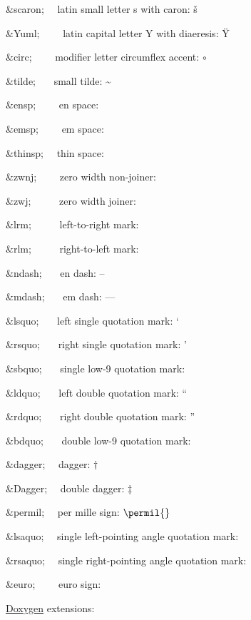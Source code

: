 \begin{DoxyItemize}
\item {\ttfamily \&scaron;}{\ttfamily ~~} latin small letter s with caron\+: \v{s} 
\item {\ttfamily \&Yuml;}{\ttfamily ~~~~} latin capital letter Y with diaeresis\+: \"{Y} 
\item {\ttfamily \&circ;}{\ttfamily ~~~~} modifier letter circumflex accent\+: {$\circ$} 
\item {\ttfamily \&tilde;}{\ttfamily ~~~} small tilde\+: \~{} 
\item {\ttfamily \&ensp;}{\ttfamily ~~~~} en space\+: \enskip{} 
\item {\ttfamily \&emsp;}{\ttfamily ~~~~} em space\+: \quad{} 
\item {\ttfamily \&thinsp;}{\ttfamily ~~} thin space\+: \, 
\item {\ttfamily \&zwnj;}{\ttfamily ~~~~} zero width non-\/joiner\+: {} 
\item {\ttfamily \&zwj;}{\ttfamily ~~~~~} zero width joiner\+:  
\item {\ttfamily \&lrm;}{\ttfamily ~~~~~} left-\/to-\/right mark\+:  
\item {\ttfamily \&rlm;}{\ttfamily ~~~~~} right-\/to-\/left mark\+:  
\item {\ttfamily \&ndash;}{\ttfamily ~~~} en dash\+: -- 
\item {\ttfamily \&mdash;}{\ttfamily ~~~} em dash\+: --- 
\item {\ttfamily \&lsquo;}{\ttfamily ~~~} left single quotation mark\+: ` 
\item {\ttfamily \&rsquo;}{\ttfamily ~~~} right single quotation mark\+: ' 
\item {\ttfamily \&sbquo;}{\ttfamily ~~~} single low-\/9 quotation mark\+: \quotesinglbase{} 
\item {\ttfamily \&ldquo;}{\ttfamily ~~~} left double quotation mark\+: `` 
\item {\ttfamily \&rdquo;}{\ttfamily ~~~} right double quotation mark\+: '' 
\item {\ttfamily \&bdquo;}{\ttfamily ~~~} double low-\/9 quotation mark\+: \quotedblbase{} 
\item {\ttfamily \&dagger;}{\ttfamily ~~} dagger\+: {$\dagger$} 
\item {\ttfamily \&Dagger;}{\ttfamily ~~} double dagger\+: {$\ddagger$} 
\item {\ttfamily \&permil;}{\ttfamily ~~} per mille sign\+: {$\permil{}$} 
\item {\ttfamily \&lsaquo;}{\ttfamily ~~} single left-\/pointing angle quotation mark\+: \guilsinglleft{} 
\item {\ttfamily \&rsaquo;}{\ttfamily ~~} single right-\/pointing angle quotation mark\+: \guilsinglright{} 
\item {\ttfamily \&euro;}{\ttfamily ~~~~} euro sign\+: \texteuro{} 
\end{DoxyItemize}\mbox{\hyperlink{class_doxygen}{Doxygen}} extensions\+: 
